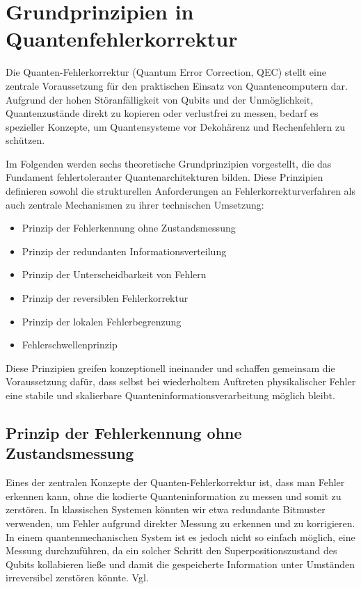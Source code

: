 \section{Grundprinzipien in Quantenfehlerkorrektur}\label{chap:QEC2}
Die Quanten-Fehlerkorrektur (Quantum Error Correction, QEC) stellt eine zentrale Voraussetzung für den praktischen Einsatz von Quantencomputern dar. Aufgrund der hohen Störanfälligkeit von Qubits und der Unmöglichkeit, Quantenzustände direkt zu kopieren oder verlustfrei zu messen, bedarf es spezieller Konzepte, um Quantensysteme vor Dekohärenz und Rechenfehlern zu schützen.

Im Folgenden werden sechs theoretische Grundprinzipien vorgestellt, die das Fundament fehlertoleranter Quantenarchitekturen bilden. Diese Prinzipien definieren sowohl die strukturellen Anforderungen an Fehlerkorrekturverfahren als auch zentrale Mechanismen zu ihrer technischen Umsetzung:

\begin{itemize}
    \item Prinzip der Fehlerkennung ohne Zustandsmessung
    \item Prinzip der redundanten Informationsverteilung
    \item Prinzip der Unterscheidbarkeit von Fehlern
    \item Prinzip der reversiblen Fehlerkorrektur
    \item Prinzip der lokalen Fehlerbegrenzung
    \item Fehlerschwellenprinzip
\end{itemize}

Diese Prinzipien greifen konzeptionell ineinander und schaffen gemeinsam die Voraussetzung dafür, dass selbst bei wiederholtem Auftreten physikalischer Fehler eine stabile und skalierbare Quanteninformationsverarbeitung möglich bleibt.

\subsection{Prinzip der Fehlerkennung ohne Zustandsmessung}
Eines der zentralen Konzepte der Quanten-Fehlerkorrektur ist, dass man Fehler erkennen kann, ohne die kodierte Quanteninformation zu messen und somit zu zerstören. In klassischen Systemen könnten wir etwa redundante Bitmuster verwenden, um Fehler aufgrund direkter Messung zu erkennen und zu korrigieren. In einem quantenmechanischen System ist es jedoch nicht so einfach möglich, eine Messung durchzuführen, da ein solcher Schritt den Superpositionszustand des Qubits kollabieren ließe und damit die gespeicherte Information unter Umständen irreversibel zerstören könnte. Vgl. \cite{nielsen_quantum_2010}

